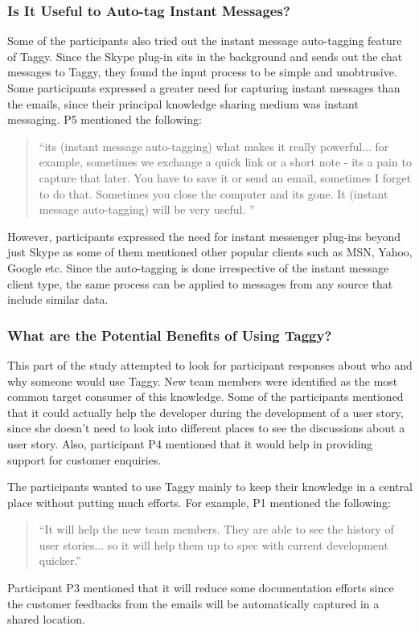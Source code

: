 \subsubsection{Is It Useful to Auto-tag Instant Messages?}
Some of the participants also tried out the instant message auto-tagging feature of Taggy. Since the Skype plug-in sits in the background and sends out the chat messages to Taggy, they found the input process to be simple and unobtrusive. Some participants expressed a greater need for capturing instant messages than the emails, since their principal knowledge sharing medium was instant messaging. P5 mentioned the following:

\begin{quote}
	``its (instant message auto-tagging) what makes it really powerful... for example, sometimes we exchange a quick link or a short note - its a pain to capture that later. You have to save it or send an email, sometimes I forget to do that. Sometimes you close the computer and its gone. It (instant message auto-tagging) will be very useful. ''
\end{quote}

However, participants expressed the need for instant messenger plug-ins beyond just Skype as some of them mentioned other popular clients such as MSN, Yahoo, Google etc. Since the auto-tagging is done irrespective of the instant message client type, the same process can be applied to messages from any source that include similar data.

\subsubsection{What are the Potential Benefits of Using Taggy?}
This part of the study attempted to look for participant responses about who and why someone would use Taggy. New team members were identified as the most common target consumer of this knowledge. Some of the participants mentioned that it could actually help the developer during the development of a user story, since she doesn't need to look into different places to see the discussions about a user story. Also, participant P4 mentioned that it would help in providing support for customer enquiries.

The participants wanted to use Taggy mainly to keep their knowledge in a central place without putting much efforts. For example, P1 mentioned the following:
\begin{quote}
	``It will help the new team members. They are able to see the history of user stories... so it will help them up to spec with current development quicker.''
\end{quote}
Participant P3 mentioned that it will reduce some documentation efforts since the customer feedbacks from the emails will be automatically captured in a shared location.


